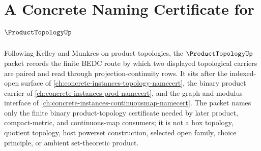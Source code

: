 \chapter{A Concrete Naming Certificate for $\ProductTopologyUp$}
\label{ch:concrete-instances-product-topology-namecert}

Following Kelley and Munkres on product topologies, the $\ProductTopologyUp$ packet records the finite BEDC route by which two displayed topological carriers are paired and read through projection-continuity rows. It sits after the indexed-open surface of \autoref{ch:concrete-instances-topology-namecert}, the binary product carrier of \autoref{ch:concrete-instances-prod-namecert}, and the graph-and-modulus interface of \autoref{ch:concrete-instances-continuousmap-namecert}. The packet names only the finite binary product-topology certificate needed by later product, compact-metric, and continuous-map consumers; it is not a box topology, quotient topology, host powerset construction, selected open family, choice principle, or ambient set-theoretic product.

